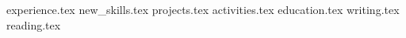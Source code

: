 \documentclass[11pt, a4paper]{awesome-cv}
\newcommand*{\sectiondir}{resume/}
\begin{document}
\makecvheader

{experience.tex}
{new_skills.tex}
{projects.tex}
{activities.tex}
{education.tex}
{writing.tex}
{reading.tex}
\end{document}
